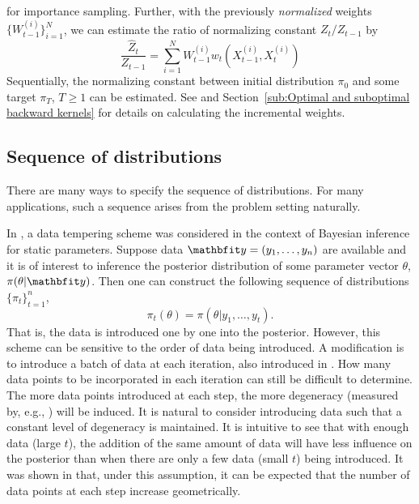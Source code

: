 for importance sampling. Further, with the previously \emph{normalized}
weights $\{W_{t-1}^{(i)}\}_{i=1}^N$, we can estimate the ratio of normalizing
constant $Z_t/Z_{t-1}$ by
\begin{equation}
  \frac{\hat{Z}_t}{Z_{t-1}} =
  \sum_{i=1}^N W_{t-1}^{(i)}w_t(X_{t-1}^{(i)},X_t^{(i)})
  \label{eq:ratio normalized}
\end{equation}
Sequentially, the normalizing constant between initial distribution $\pi_0$
and some target $\pi_T$, $T\ge1$ can be estimated. See \cite{DelMoral:2006hc}
and Section~\ref{sub:Optimal and suboptimal backward kernels} for details on
calculating the incremental weights.

\subsection{Sequence of distributions}
\label{sub:Sequence of distributions}

There are many ways to specify the sequence of distributions. For many
applications, such a sequence arises from the problem setting naturally.

In \cite{Chopin:2002hg}, a data tempering scheme was considered in the context
of Bayesian inference for static parameters. Suppose data $\data =
(y_1,\dots,y_n)$ are available and it is of interest to inference the
posterior distribution of some parameter vector $\theta$, $\pi(\theta|\data)$.
Then one can construct the following sequence of distributions
$\{\pi_t\}_{t=1}^n$,
\begin{equation}
  \pi_t(\theta) = \pi(\theta|y_1,\dots,y_t).
\end{equation}
That is, the data is introduced one by one into the posterior. However, this
scheme can be sensitive to the order of data being introduced. A modification
is to introduce a batch of data at each iteration, also introduced in
\cite{Chopin:2002hg}. How many data points to be incorporated in each
iteration can still be difficult to determine. The more data points introduced
at each step, the more degeneracy (measured by, e.g., \ess) will be induced.
It is natural to consider introducing data such that a constant level of
degeneracy is maintained. It is intuitive to see that with enough data (large
$t$), the addition of the same amount of data will have less influence on the
posterior than when there are only a few data (small $t$) being introduced.
It was shown in \cite{Chopin:2002hg} that, under this assumption, it can be
expected that the number of data points at each step increase geometrically.


